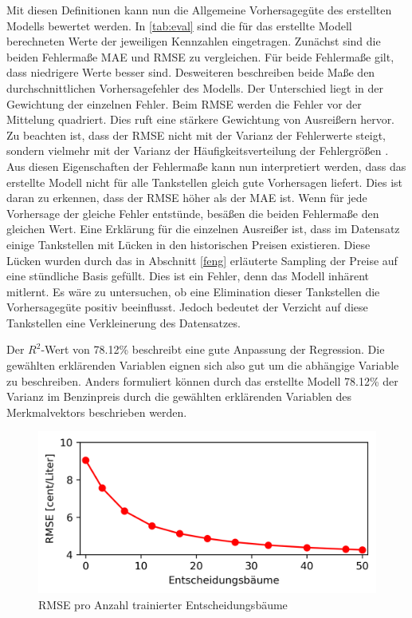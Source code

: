 \documentclass[
ngerman          %
,a4paper          %
,11pt
,pdftex
]{report}
\begin{document}
Mit diesen Definitionen kann nun die Allgemeine Vorhersagegüte des erstellten Modells bewertet werden. In \autoref{tab:eval} sind die für das erstellte Modell berechneten Werte der jeweiligen Kennzahlen eingetragen. Zunächst sind die beiden Fehlermaße \ac{MAE} und \ac{RMSE} zu vergleichen. Für beide Fehlermaße gilt, dass niedrigere Werte besser sind. Desweiteren beschreiben beide Maße den durchschnittlichen Vorhersagefehler des Modells. Der Unterschied liegt in der Gewichtung der einzelnen Fehler. Beim \ac{RMSE} werden die Fehler vor der Mittelung quadriert. Dies ruft eine stärkere Gewichtung von Ausreißern hervor. Zu beachten ist, dass der \ac{RMSE} nicht mit der Varianz der Fehlerwerte steigt, sondern vielmehr mit der Varianz der Häufigkeitsverteilung der Fehlergrößen \cite{maermse}. Aus diesen Eigenschaften der Fehlermaße kann nun interpretiert werden, dass das erstellte Modell nicht für alle Tankstellen gleich gute Vorhersagen liefert. Dies ist daran zu erkennen, dass der \ac{RMSE} höher als der \ac{MAE} ist. Wenn für jede Vorhersage der gleiche Fehler entstünde, besäßen die beiden Fehlermaße den gleichen Wert. Eine Erklärung für die einzelnen Ausreißer ist, dass im Datensatz einige Tankstellen mit Lücken in den historischen Preisen existieren. Diese Lücken wurden durch das in Abschnitt \ref{feng} erläuterte Sampling der Preise auf eine stündliche Basis gefüllt. Dies ist ein Fehler, denn das Modell inhärent mitlernt. Es wäre zu untersuchen, ob eine Elimination dieser Tankstellen die Vorhersagegüte positiv beeinflusst. Jedoch bedeutet der Verzicht auf diese Tankstellen eine Verkleinerung des Datensatzes. \\
\par 
Der $R^2$-Wert von 78.12\% beschreibt eine gute Anpassung der Regression. Die gewählten erklärenden Variablen eignen sich also gut um die abhängige Variable zu beschreiben. Anders formuliert können durch das erstellte Modell 78.12\% der Varianz im Benzinpreis durch die gewählten erklärenden Variablen des Merkmalvektors beschrieben werden. \\
\par 

\begin{figure}
	\centering
	\includegraphics[width=0.7\linewidth]{images/eval_rmse_per_trees}
	\caption{RMSE pro Anzahl trainierter Entscheidungsbäume}
	\label{fig:evalrmsepertrees}
\end{figure}
\end{document}
